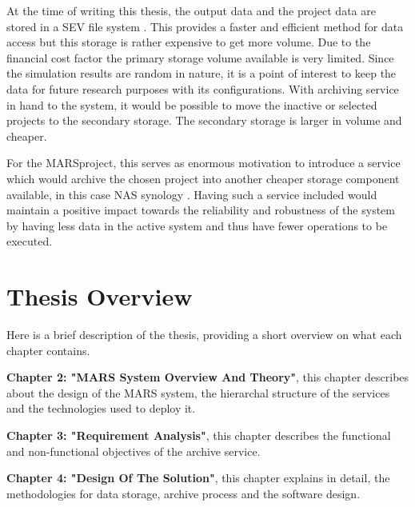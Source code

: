    
        \par

        At the time of writing this thesis, the output data and the project data are stored in a
        SEV file system \cite{SEV}. This provides a faster and efficient method for data
        access but this storage is rather expensive to get more volume. Due to the financial cost 
        factor the primary storage volume available is very limited. Since the simulation 
        results are random in nature, it is a point of interest to keep the data for future
        research purposes with its configurations. With archiving service in hand to the system, 
        it would be possible to move the inactive or selected projects to the secondary storage. 
        The secondary storage is larger in volume and cheaper. 
        
        \par

        For the MARS\footnotemark[\value{footnote}] project, this serves as enormous
        motivation to introduce a service which would archive the chosen project
        into another cheaper storage component available, in this case NAS synology 
        \cite{Synology}. Having such a service included would maintain a positive impact 
        towards the reliability and robustness of the system by having less data in the 
        active system and thus have fewer operations to be executed.
        


    

    \section{Thesis Overview}
        Here is a brief description of the thesis, providing a short overview on what each
        chapter contains.
        
        \par
        \textbf{Chapter 2: "MARS System Overview And Theory"}, this chapter describes about the design
        of the MARS system, the hierarchal structure of the services and the technologies used to
        deploy it.

        \par
        \textbf{Chapter 3: "Requirement Analysis"}, this chapter describes the functional and
        non-functional objectives of the archive service.

        \par
        \textbf{Chapter 4: "Design Of The Solution"}, this chapter explains in detail, the 
        methodologies for data storage, archive process and the software design.

